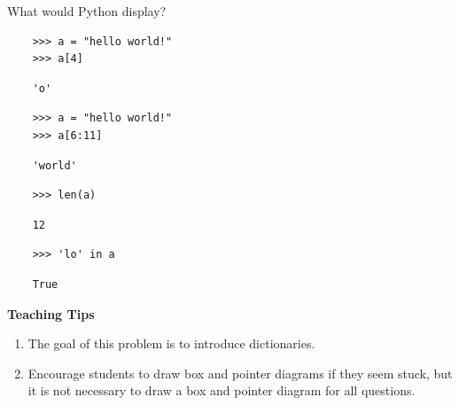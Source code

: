 \begin{blocksection}
    \question What would Python display?
    
    \begin{lstlisting}
    >>> a = "hello world!"
    >>> a[4]
    \end{lstlisting}
    \begin{solution}[.25in]
    \begin{lstlisting}
    'o'
    \end{lstlisting}
    \end{solution}

    \begin{lstlisting}
    >>> a = "hello world!"
    >>> a[6:11]
    \end{lstlisting}
    \begin{solution}[.25in]
    \begin{lstlisting}
    'world'
    \end{lstlisting}
    \end{solution}

    \begin{lstlisting}
    >>> len(a)
    \end{lstlisting}
    \begin{solution}[.25in]
    \begin{lstlisting}
    12
    \end{lstlisting}
    \end{solution}

    \begin{lstlisting}
    >>> 'lo' in a
    \end{lstlisting}
    \begin{solution}[.25in]
    \begin{lstlisting}
    True
    \end{lstlisting}
    \end{solution}

    
    \begin{questionmeta}
        \textbf{Teaching Tips}
        \begin{enumerate}
                \item The goal of this problem is to introduce dictionaries. 
                \item Encourage students to draw box and pointer diagrams if they seem stuck, but it is not necessary to draw a box and pointer diagram for all questions. 
        \end{enumerate}
    \end{questionmeta}
\end{blocksection}
